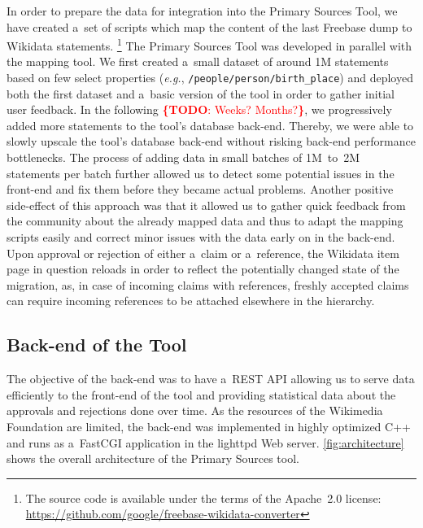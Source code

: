 \documentclass{acm_proc_article-sp}
\newcommand{\todo}[1]{\noindent\textcolor{red}{{\bf \{TODO}: #1{\bf \}}}}
\begin{document}
In order to prepare the data for integration into the Primary Sources Tool,
we have created a~set of scripts which map the content
of the last Freebase dump to Wikidata statements.%
\footnote{The source code is available under the terms of the Apache~2.0 license:
\url{https://github.com/google/freebase-wikidata-converter}}
The Primary Sources Tool was developed in parallel with the mapping tool.
We first created a~small dataset of around 1M statements
based on few select properties (\emph{e.g.}, \texttt{/people/person/birth\_place})
and deployed both the first dataset and a~basic version of the tool
in order to gather initial user feedback.
In the following \todo{Weeks? Months?}, we progressively added more statements to the tool's database back-end.
Thereby, we were able to slowly upscale the tool's database back-end
without risking back-end performance bottlenecks.
The process of adding data in small batches of 1M~to~2M statements per batch
further allowed us to detect some potential issues in the front-end
and fix them before they became actual problems.
Another positive side-effect of this approach was that it allowed us to gather quick feedback
from the community about the already mapped data and thus to adapt the mapping scripts easily
and correct minor issues with the data early on in the back-end.
Upon approval or rejection of either a~claim or a~reference,
the Wikidata item page in question reloads in order to reflect
the potentially changed state of the migration, as,
in case of incoming claims with references, freshly accepted claims 
can require incoming references to be attached elsewhere in the hierarchy. 

\subsection{Back-end of the Tool}

The objective of the back-end was to have a~REST API allowing us
to serve data efficiently to the front-end of the tool and
providing statistical data about the approvals and rejections done over time.
As the resources of the Wikimedia Foundation are limited,
the back-end was implemented in highly optimized C++
and runs as a~FastCGI application in the lighttpd Web server.
\autoref{fig:architecture} shows the overall architecture of the Primary Sources tool.
\end{document}

